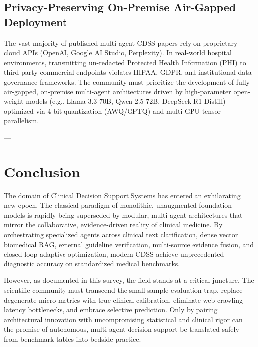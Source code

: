 \documentclass[conference]{IEEEtran}
\begin{document}
\subsection{Privacy-Preserving On-Premise Air-Gapped Deployment}
The vast majority of published multi-agent CDSS papers rely on proprietary cloud APIs (OpenAI, Google AI Studio, Perplexity). In real-world hospital environments, transmitting un-redacted Protected Health Information (PHI) to third-party commercial endpoints violates HIPAA, GDPR, and institutional data governance frameworks. The community must prioritize the development of fully air-gapped, on-premise multi-agent architectures driven by high-parameter open-weight models (e.g., Llama-3.3-70B, Qwen-2.5-72B, DeepSeek-R1-Distill) optimized via 4-bit quantization (AWQ/GPTQ) and multi-GPU tensor parallelism.

---

\section{Conclusion}

The domain of Clinical Decision Support Systems has entered an exhilarating new epoch. The classical paradigm of monolithic, unaugmented foundation models is rapidly being superseded by modular, multi-agent architectures that mirror the collaborative, evidence-driven reality of clinical medicine. By orchestrating specialized agents across clinical text clarification, dense vector biomedical RAG, external guideline verification, multi-source evidence fusion, and closed-loop adaptive optimization, modern CDSS achieve unprecedented diagnostic accuracy on standardized medical benchmarks.

However, as documented in this survey, the field stands at a critical juncture. The scientific community must transcend the small-sample evaluation trap, replace degenerate micro-metrics with true clinical calibration, eliminate web-crawling latency bottlenecks, and embrace selective prediction. Only by pairing architectural innovation with uncompromising statistical and clinical rigor can the promise of autonomous, multi-agent decision support be translated safely from benchmark tables into bedside practice.

\balance
\end{document}
